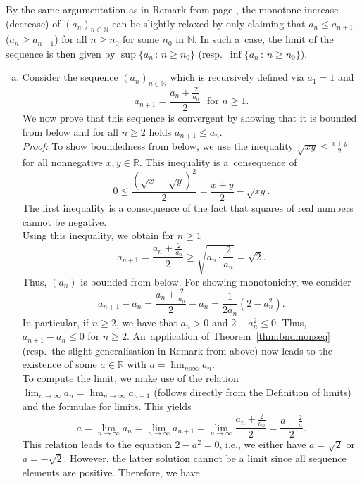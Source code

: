 \begin{Remark}{}\label{rem:monseqgen}
    By the same argumentation as in Remark from page \pageref{rem:n_0mon}, the monotone increase (decrease) of $(a_n)_{n\in\mathbb{N}}$ can be slightly relaxed by only claiming that $a_n\leq a_{n+1}$ ($a_n\geq a_{n+1}$) for all $n\geq n_0$ for some $n_0$ in $\mathbb{N}$. In such a~case, the limit of the sequence is then given by $\sup\{a_n\,:\,n\geq n_0\}$ (resp.\ $\inf\{a_n\,:\,n\geq n_0\}$).
\end{Remark}

\begin{example}{}\label{ex:monseqconv}
 \begin{enumerate}[a)]
  \item Consider the sequence $(a_n)_{n\in\mathbb{N}}$ which is recursively defined via $a_1=1$ and 
  \[a_{n+1}=\frac{a_n+\frac2{a_n}}{2}\;\text{  for $n\geq 1$.}\] 
  We now prove that this sequence is convergent by showing that
it is bounded from below and for all $n\geq2$ holds $a_{n+1}\leq a_n$.\\[2ex]
{\em Proof:} To show boundedness from below, we use the inequality $\sqrt{xy}\leq\frac{x+y}2$ for all nonnegative $x,y\in\mathbb{R}$. This inequality is a~consequence of
\[0\leq\frac{(\sqrt{x}-\sqrt{y})^2}2=\frac{x+y}2-\sqrt{xy}.\]
The first inequality is a consequence of the fact that squares of real numbers cannot be negative.\\
Using this inequality, we obtain for $n\geq1$
\[a_{n+1}=\frac{a_n+\frac{2}{a_n}}{2}\geq \sqrt{a_n\cdot\frac2{a_n}}=\sqrt{2}.\]
Thus, $(a_n)$ is bounded from below. For showing monotonicity, we consider
\[a_{n+1}-a_n=\frac{a_n+\frac2{a_n}}{2}-a_n=\frac{1}{2a_n}(2-a_n^2).\]
In particular, if $n\geq2$, we have that $a_n>0$ and $2-a_n^2\leq0$. Thus, $a_{n+1}-a_n\leq0$ for $n\geq2$. An~application of Theorem~\ref{thm:bndmonseq} (resp.\ the slight generalisation in Remark %
from above) 
now leads to the existence of some $a\in\mathbb{R}$ with $a=\lim_{n	o\infty}a_n$.\\[2ex]
To compute the limit, we make use of the relation $\lim_{n \to\infty}a_n=\lim_{n\to\infty}a_{n+1}$ (follows directly from the Definition of limits) and the formulae for limits. This yields
\[a=\lim_{n \to\infty}a_n=\lim_{n\to\infty}a_{n+1}=\lim_{n\to\infty}\frac{a_n+\frac2{a_n}}{2}=\frac{a+\frac2{a}}{2}.\]
This relation leads to the equation $2-a^2=0$, i.e., we either have $a=\sqrt{2}$ or $a=-\sqrt{2}$. However, the latter solution cannot be a limit since all sequence elements are positive. Therefore, we have

\end{enumerate}
\end{example}
